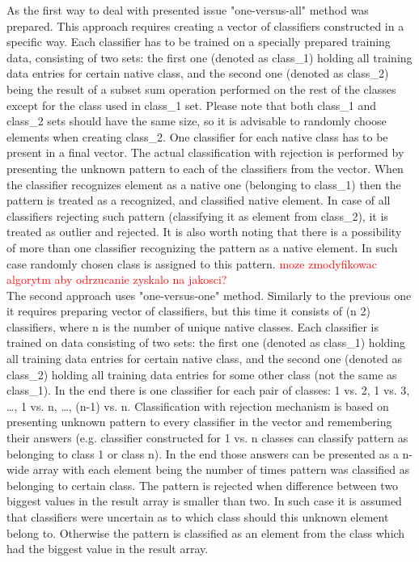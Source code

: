 \documentclass{llncs}
\begin{document}
As the first way to deal with presented issue "one-versus-all" method was prepared. This approach requires creating a vector of classifiers constructed in a specific way. Each classifier has to be trained on a specially prepared training data, consisting of two sets: the first one (denoted as class\_1) holding all training data entries for certain native class, and the second one (denoted as class\_2) being the result of a subset sum operation performed on the rest of the classes except for the class used in class\_1 set. Please note that both class\_1 and class\_2 sets should have the same size, so it is advisable to randomly choose elements when creating class\_2. One classifier for each native class has to be present in a final vector. The actual classification with rejection is performed by presenting the unknown pattern to each of the classifiers from the vector. When the classifier recognizes element as a native one (belonging to class\_1) then the pattern is treated as a recognized, and classified native element. In case of all classifiers rejecting such pattern (classifying it as element from class\_2), it is treated as outlier and rejected. It is also worth noting that there is a possibility of more than one classifier recognizing the pattern as a native element. In such case randomly chosen class is assigned to this pattern. \textcolor{red}{moze zmodyfikowac algorytm aby odrzucanie zyskalo na jakosci?} \\

The second approach uses "one-versus-one" method. Similarly to the previous one it requires preparing vector of classifiers, but this time it consists of (n 2) classifiers, where n is the number of unique native classes. Each classifier is trained on data consisting of two sets: the first one (denoted as class\_1) holding all training data entries for certain native class, and the second one (denoted as class\_2) holding all training data entries for some other class (not the same as class\_1). In the end there is one classifier for each pair of classes: 1 vs. 2, 1 vs. 3, \dots, 1 vs. n, \dots, (n-1) vs. n. Classification with rejection mechanism is based on presenting unknown pattern to every classifier in the vector and remembering their answers (e.g. classifier constructed for 1 vs. n classes can classify pattern as belonging to class 1 or class n). In the end those answers can be presented as a n-wide array with each element being the number of times pattern was classified as belonging to certain class. The pattern is rejected when difference between two biggest values in the result array is smaller than two. In such case it is assumed that classifiers were uncertain as to which class should this unknown element belong to. Otherwise the pattern is classified as an element from the class which had the biggest value in the result array. \\
\end{document}
